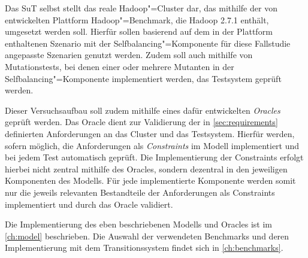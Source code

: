 Das \gls{SuT} selbst stellt das reale Hadoop"=Cluster dar, das mithilfe der von \citeauthor{Zhang2016} entwickelten Plattform Hadoop"=Benchmark, die Hadoop 2.7.1 enthält, umgesetzt werden soll.
Hierfür sollen basierend auf dem in der Plattform enthaltenen Szenario mit der Selfbalancing"=Komponente für diese Fallstudie angepasste Szenarien genutzt werden.
Zudem soll auch mithilfe von Mutationstests, bei denen einer oder mehrere Mutanten in der Selfbalancing"=Komponente implementiert werden, das Testsystem geprüft werden.

Dieser Versuchsaufbau soll zudem mithilfe eines dafür entwickelten \emph{Oracles} geprüft werden.
Das Oracle dient zur Validierung der in \cref{sec:requirements} definierten Anforderungen an das Cluster und das Testsystem.
Hierfür werden, sofern möglich, die Anforderungen als \emph{Constraints} im Modell implementiert und bei jedem \gls{Test} automatisch geprüft.
Die Implementierung der Constraints erfolgt hierbei nicht zentral mithilfe des Oracles, sondern dezentral in den jeweiligen Komponenten des Modells.
Für jede implementierte Komponente werden somit nur die jeweils relevanten Bestandteile der Anforderungen als Constraints implementiert und durch das Oracle validiert.

Die Implementierung des eben beschriebenen Modells und Oracles ist im \cref{ch:model} beschrieben.
Die Auswahl der verwendeten Benchmarks und deren Implementierung mit dem Transitionssystem findet sich in \cref{ch:benchmarks}.
